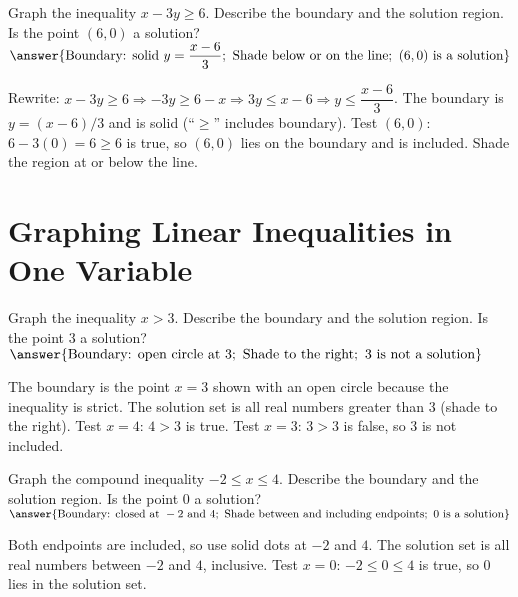 \documentclass{ximera}
\begin{document}
\begin{problem}
Graph the inequality \(x - 3y \ge 6\). Describe the boundary and the solution region. Is the point \((6,0)\) a solution?
$\answer{\text{Boundary: solid }y=\dfrac{x-6}{3};\ \text{Shade below or on the line};\ (6,0)\ \text{is a solution}}$
\begin{feedback}
Rewrite: \(x-3y\ge6 \Rightarrow -3y\ge6-x \Rightarrow 3y\le x-6 \Rightarrow y\le\dfrac{x-6}{3}\). The boundary is \(y=(x-6)/3\) and is solid (``\(\ge\)'' includes boundary). Test \((6,0)\): \(6-3(0)=6\ge6\) is true, so \((6,0)\) lies on the boundary and is included. Shade the region at or below the line.
\end{feedback}
\end{problem}



\section*{Graphing Linear Inequalities in One Variable}

\begin{problem}
Graph the inequality \(x > 3\). Describe the boundary and the solution region. Is the point \(3\) a solution?
$\answer{\text{Boundary: open circle at }3;\ \text{Shade to the right};\ 3\ \text{is not a solution}}$
\begin{feedback}
The boundary is the point \(x=3\) shown with an open circle because the inequality is strict. The solution set is all real numbers greater than 3 (shade to the right). Test \(x=4\): \(4>3\) is true. Test \(x=3\): \(3>3\) is false, so \(3\) is not included.
\end{feedback}
\end{problem}

\begin{problem}
Graph the compound inequality \(-2 \le x \le 4\). Describe the boundary and the solution region. Is the point \(0\) a solution?
$\answer{\text{Boundary: closed at }-2\text{ and }4;\ \text{Shade between and including endpoints};\ 0\ \text{is a solution}}$
\begin{feedback}
Both endpoints are included, so use solid dots at \(-2\) and \(4\). The solution set is all real numbers between \(-2\) and \(4\), inclusive. Test \(x=0\): \(-2\le0\le4\) is true, so \(0\) lies in the solution set.
\end{feedback}
\end{problem}
\end{document}
